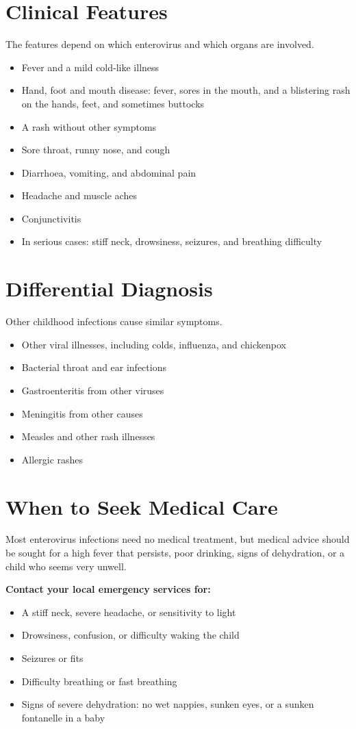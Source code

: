 \section*{Clinical Features}
The features depend on which enterovirus and which organs are involved.
\begin{itemize}
    \item Fever and a mild cold-like illness
    \item Hand, foot and mouth disease: fever, sores in the mouth, and a blistering rash on the hands, feet, and sometimes buttocks
    \item A rash without other symptoms
    \item Sore throat, runny nose, and cough
    \item Diarrhoea, vomiting, and abdominal pain
    \item Headache and muscle aches
    \item Conjunctivitis
    \item In serious cases: stiff neck, drowsiness, seizures, and breathing difficulty
\end{itemize}

\section*{Differential Diagnosis}
Other childhood infections cause similar symptoms.
\begin{itemize}
    \item Other viral illnesses, including colds, influenza, and chickenpox
    \item Bacterial throat and ear infections
    \item Gastroenteritis from other viruses
    \item Meningitis from other causes
    \item Measles and other rash illnesses
    \item Allergic rashes
\end{itemize}

\section*{When to Seek Medical Care}
Most enterovirus infections need no medical treatment, but medical advice should be sought for a high fever that persists, poor drinking, signs of dehydration, or a child who seems very unwell.

\textbf{Contact your local emergency services for:}
\begin{itemize}
    \item A stiff neck, severe headache, or sensitivity to light
    \item Drowsiness, confusion, or difficulty waking the child
    \item Seizures or fits
    \item Difficulty breathing or fast breathing
    \item Signs of severe dehydration: no wet nappies, sunken eyes, or a sunken fontanelle in a baby
\end{itemize}

